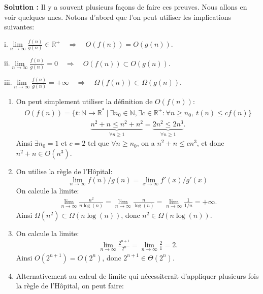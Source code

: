 \documentclass[11pt]{article} %
\newenvironment{solution}[1][\unskip]{%
	\par
	\noindent
	\textbf{Solution #1:}
	\noindent}
{\medskip}
\begin{document}
\begin{solution}
	Il y a souvent plusieurs façons de faire ces preuves. Nous allons en voir quelques unes. Notons d'abord que l'on peut utiliser les implications suivantes:
	\begin{list}{}
		\item{i.}{$\lim\limits_{n\rightarrow\infty}\frac{f(n)}{g(n)} \in \mathbb{R}^{+} \quad \Rightarrow \quad O(f(n))=O(g(n)).$}
		\item{ii.}{$\lim\limits_{n\rightarrow\infty}\frac{f(n)}{g(n)}=0 \quad \Rightarrow \quad O(f(n)) \subset O(g(n)).$}
		\item{iii.}{$\lim\limits_{n\rightarrow\infty}\frac{f(n)}{g(n)}=+\infty \quad \Rightarrow \quad \Omega(f(n)) \subset \Omega(g(n)).$}
	\end{list}
	\begin{enumerate}
		\item{On peut simplement utiliser la définition de $O(f(n))$:
			\begin{align*}
			O(f(n))=\{t:\mathbb{N}\rightarrow\mathbb{R^*} \ | \ \exists n_0\in \mathbb{N}, \exists c\in \mathbb{R}^+ : \forall n\geq n_0, \ t(n) \leq c f(n)\}
			\end{align*}
			\begin{align*}
			\underbrace{n^2+n \leq n^2 + n^2}_{\forall n\geq 1} = \underbrace{2n^2 \leq 2n^3}_{\forall n\geq 1}.
			\end{align*}
			Ainsi $\exists n_0=1$ et $c=2$ tel que $\forall n\geq n_0$, on a $n^2 +n \leq c n^3$, et donc $n^2 + n \in O(n^3)$.}
		\item {On utilise la règle de l'Hôpital: $$\lim\limits_{n \rightarrow \infty}f(n)/g(n) = \lim\limits_{x \rightarrow \infty} f'(x)/g'(x) $$
			On calcule la limite:
		\begin{align*}
		\lim\limits_{n\rightarrow \infty}\frac{n^2}{n\log (n)}=\lim\limits_{n\rightarrow \infty}\frac{n}{\log(n)}=\lim\limits_{n\rightarrow \infty}\frac{1}{1/n}=+\infty.
		\end{align*}
		Ainsi $\Omega(n^2)\subset \Omega(n\log(n))$, donc $n^2 \in \Omega(n\log(n))$.	
		}
		\item {On calcule la limite:
			\begin{align*}
			\lim\limits_{n\rightarrow \infty}\frac{2^{n+1}}{2^n}=\lim\limits_{n\rightarrow \infty}\frac{2}{1}=2.
			\end{align*}
			Ainsi $O(2^{n+1}) = O(2^n)$, donc $2^{n+1} \in \Theta(2^n)$.
			}
		\item{Alternativement au calcul de limite qui nécessiterait d'appliquer plusieurs fois la règle de l'Hôpital, on peut faire:
}
\end{enumerate}
\end{solution}
\end{document}
